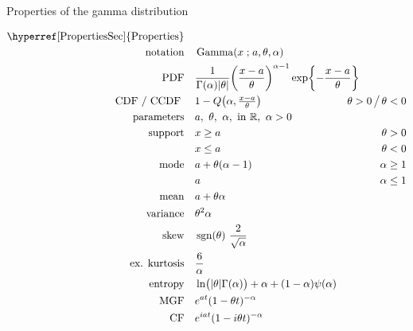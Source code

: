 

\begin{table*}[tp!]

\caption[Gamma distribution -- Properties]{Properties of the gamma distribution}

\begin{align*}
\text{\hyperref[PropertiesSec]{Properties}}  \quad& \\
\text{notation} \quad &  \op{Gamma}(x\given a, \theta, \alpha) 	\checked
\\
\text{PDF} \quad &
\frac{1}{\Gamma(\alpha)\Left|\theta\Right|} 
\Left(\frac{x-a}{\theta}\Right)^{\alpha  -1}
\exp \Left\{
-  \frac{x-a}{\theta}
\Right\}
\checked \hspace{-8em}						
\\ 
\text{CDF / CCDF } \quad  &    1-Q\Left(\alpha, \tfrac{x - a }{\theta} \Right) \checked
& \theta>0 \, \big/ \,  \theta<0
\\
\text{parameters}\quad &   a,\ \theta,\ \alpha,\  \text{in } \Real, \ \alpha>0
\\
\text{support} \quad &     x \geq a &  \theta > 0
\\
&   x\leq a  &  \theta < 0 
\\
\text{mode} \quad&   a+ \theta (\alpha-1)
& \alpha   \geq 1 \checked
\\ & a & \alpha   \le 1 \checked
\\
\text{mean} \quad& a  + \theta \alpha \checked
\\
\text{variance}  \quad&   \theta^2 \alpha \checked & 
\\
\text{skew} \quad  &  \op{sgn}(\theta)\ \frac{2}{\sqrt{\alpha}}  \checked
\\
\text{ex. kurtosis} \quad  &  \frac{6}{\alpha} \checked
\\
\text{entropy} \quad& 
\ln \bigl(|\theta| \Gamma(\alpha) \bigr)+\alpha + \Left( 1 - \alpha\Right) \psi(\alpha) \checked
\\
\text{MGF} \quad  &   e^{a t} (1- \theta t)^{-\alpha}	\checked
\\
\text{CF} \quad  &  e^{i a t} (1- i \theta t)^{-\alpha}		\checked
\end{align*}
\end{table*}



